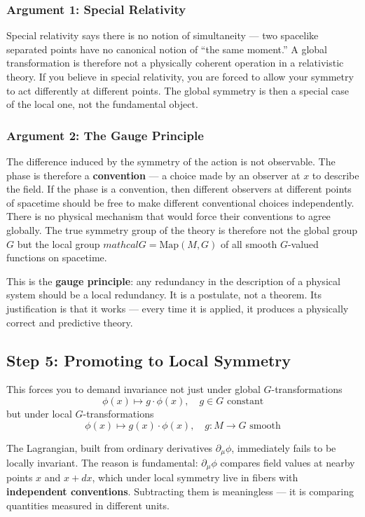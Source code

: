 \documentclass[a4paper]{article}
\begin{document}
\subsubsection*{Argument 1: Special Relativity}

Special relativity says there is no notion of simultaneity — two spacelike separated points have no canonical notion of ``the same moment.'' A global transformation is therefore not a physically coherent operation in a relativistic theory. If you believe in special relativity, you are forced to allow your symmetry to act differently at different points. The global symmetry is then a special case of the local one, not the fundamental object.

\subsubsection*{Argument 2: The Gauge Principle}

The difference induced by the symmetry of the action is not observable. The phase is therefore a \textbf{convention} --- a choice made by an observer at $x$ to  describe the field. If the phase is a convention, then different observers at different points of spacetime should be free to make different conventional choices independently. There is no physical mechanism that would force their conventions to agree globally. The true symmetry group of the theory is therefore not the global group $G$ but the local group $mathcal{G} = \mathrm{Map}(M, G)$ of all smooth $G$-valued functions on spacetime.

This is the \textbf{gauge principle}: any redundancy in the description of a physical system should be a local redundancy. It is a postulate, not a theorem. Its justification is that it works --- every time it is applied, it produces a physically correct and predictive theory.

\subsection*{Step 5: Promoting to Local Symmetry}

This forces you to demand invariance not just under global $G$-transformations
\[
\phi(x) \mapsto g \cdot \phi(x), \quad g \in G \text{ constant}
\]
but under local $G$-transformations
\[
\phi(x) \mapsto g(x) \cdot \phi(x), \quad g: M \to G \text{ smooth}
\]

The Lagrangian, built from ordinary derivatives $\partial_\mu\phi$, immediately fails to be 
locally invariant. The reason is fundamental: $\partial_\mu\phi$ compares field values at 
nearby points $x$ and $x + dx$, which under local symmetry live in fibers with 
\textbf{independent conventions}. Subtracting them is meaningless — it is comparing 
quantities measured in different units.
\end{document}
